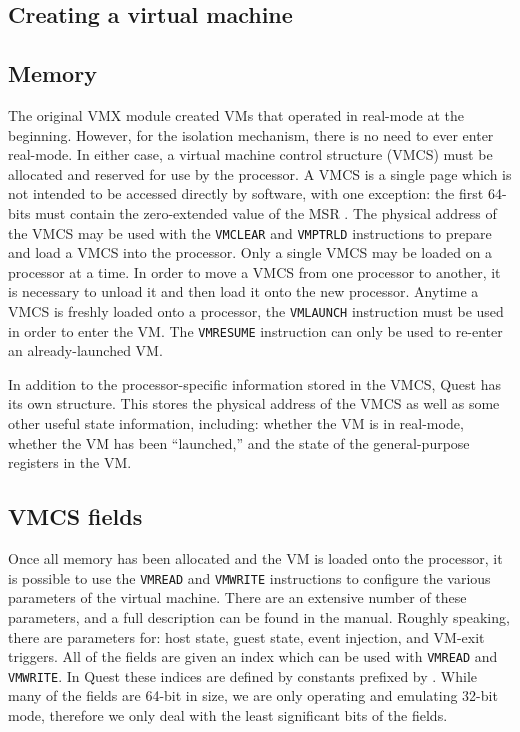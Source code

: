 \documentclass[twocolumn]{article}
\newcommand\type[1]{{\path {#1}}}
\newcommand\defn[1]{{\path {#1}}}
\newcommand\MSR[1]{{\path {#1}}}
\newcommand\inst[1]{{\tt {#1}}}
\begin{document}
\subsection{Creating a virtual machine}
\subsection{Memory}
The original VMX module created VMs that operated in real-mode at the
beginning.  However, for the isolation mechanism, there is no need to
ever enter real-mode.  In either case, a virtual machine control
structure (VMCS) must be allocated and reserved for use by the
processor.  A VMCS is a single page which is not intended to be
accessed directly by software, with one exception: the first 64-bits
must contain the zero-extended value of the MSR \MSR{IA32_VMX_BASIC}.
The physical address of the VMCS may be used with the \inst{VMCLEAR}
and \inst{VMPTRLD} instructions to prepare and load a VMCS into the
processor.  Only a single VMCS may be loaded on a processor at a time.
In order to move a VMCS from one processor to another, it is necessary
to unload it and then load it onto the new processor.  Anytime a VMCS
is freshly loaded onto a processor, the \inst{VMLAUNCH} instruction
must be used in order to enter the VM.  The \inst{VMRESUME}
instruction can only be used to re-enter an already-launched VM.

In addition to the processor-specific information stored in the VMCS,
Quest has its own \type{virtual_machine} structure.  This stores the
physical address of the VMCS as well as some other useful state
information, including: whether the VM is in real-mode, whether the VM
has been ``launched,'' and the state of the general-purpose registers
in the VM.

\subsection{VMCS fields}
Once all memory has been allocated and the VM is loaded onto the
processor, it is possible to use the \inst{VMREAD} and \inst{VMWRITE}
instructions to configure the various parameters of the virtual
machine.  There are an extensive number of these parameters, and a
full description can be found in the manual.  Roughly speaking, there
are parameters for: host state, guest state, event injection, and
VM-exit triggers.  All of the fields are given an index which can be
used with \inst{VMREAD} and \inst{VMWRITE}.  In Quest these indices
are defined by constants prefixed by \defn{VMXENC_}.  While many of
the fields are 64-bit in size, we are only operating and emulating
32-bit mode, therefore we only deal with the least significant bits of
the fields.
\end{document}
